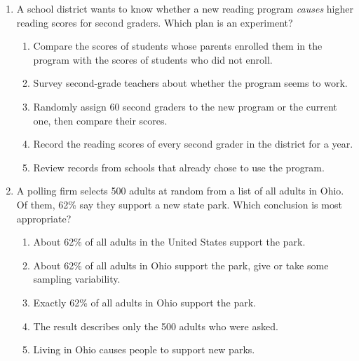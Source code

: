 \documentclass[12pt]{article}
\begin{document}
\begin{enumerate}[leftmargin=1.9em, itemsep=0.10in]

  \item A school district wants to know whether a new reading program \emph{causes} higher
        reading scores for second graders. Which plan is an experiment?
        \begin{enumerate}[label=\textbf{(\Alph*)}, leftmargin=2.2em, itemsep=1pt]
          \item Compare the scores of students whose parents enrolled them in the program with
                the scores of students who did not enroll.
          \item Survey second-grade teachers about whether the program seems to work.
          \item Randomly assign 60 second graders to the new program or the current one, then
                compare their scores.
          \item Record the reading scores of every second grader in the district for a year.
          \item Review records from schools that already chose to use the program.
                \hfill{}\rule[-0.2in]{0pt}{0.48in}
        \end{enumerate}

  \item A polling firm selects 500 adults at random from a list of all adults in Ohio. Of
        them, 62\% say they support a new state park. Which conclusion is most appropriate?
        \begin{enumerate}[label=\textbf{(\Alph*)}, leftmargin=2.2em, itemsep=1pt]
          \item About 62\% of all adults in the United States support the park.
          \item About 62\% of all adults in Ohio support the park, give or take some
                sampling variability.
          \item Exactly 62\% of all adults in Ohio support the park.
          \item The result describes only the 500 adults who were asked.
          \item Living in Ohio causes people to support new parks.
                \hfill{}\rule[-0.2in]{0pt}{0.48in}
        \end{enumerate}

\end{enumerate}
\end{document}
